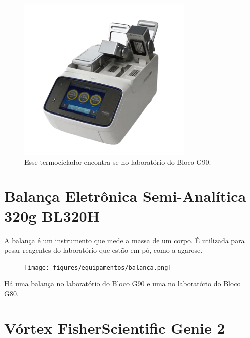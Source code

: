 \documentclass[
  letterpaper,
  DIV=11,
  numbers=noendperiod]{scrreprt}
\begin{document}
\begin{figure}

{\centering \includegraphics[width=\textwidth,height=3.125in]{figures/equipamentos/termiciclador_applied_biosystems.png}

}

\caption{Esse termociclador encontra-se no laboratório do Bloco G90.}

\end{figure}

\hypertarget{balanuxe7a-eletruxf4nica-semi-analuxedtica-320g-bl320h}{%
\section{Balança Eletrônica Semi-Analítica 320g
BL320H}\label{balanuxe7a-eletruxf4nica-semi-analuxedtica-320g-bl320h}}

A balança é um instrumento que mede a massa de um corpo. É utilizada
para pesar reagentes do laboratório que estão em pó, como a agarose.

\begin{figure}

{\centering \texttt{[image: figures/equipamentos/balança.png]}

}

\end{figure}

Há uma balança no laboratório do Bloco G90 e uma no laboratório do Bloco
G80.

\hypertarget{vuxf3rtex-fisherscientific-genie-2}{%
\section{Vórtex FisherScientific Genie
2}\label{vuxf3rtex-fisherscientific-genie-2}}
\end{document}
